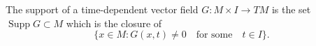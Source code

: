 The support of a time-dependent vector field $G: M \times I \rightarrow TM$ is the set $\operatorname{Supp} G \subset M$ which is the closure of
\[
\{x \in M: G(x,t) \neq 0 \quad \text{for some} \quad t \in I\}.
\]
